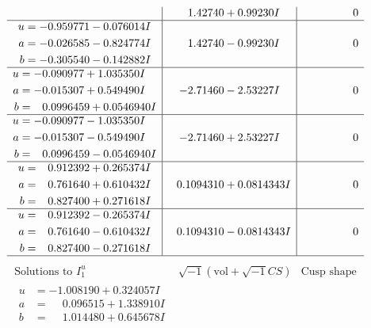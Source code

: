 \documentclass[1p]{elsarticle_modified}
\theoremstyle{definition}
\newcommand{\I}{\sqrt{-1}}
\begin{document}
$$\begin{array}{c|c|c}
 & \phantom{-}1.42740 + 0.99230 I & \phantom{-0.000000 } 0 \\ \hline\begin{aligned}
u &= -0.959771 - 0.076014 I \\
a &= -0.026585 - 0.824774 I \\
b &= -0.305540 - 0.142882 I\end{aligned}
 & \phantom{-}1.42740 - 0.99230 I & \phantom{-0.000000 } 0 \\ \hline\begin{aligned}
u &= -0.090977 + 1.035350 I \\
a &= -0.015307 + 0.549490 I \\
b &= \phantom{-}0.0996459 + 0.0546940 I\end{aligned}
 & -2.71460 - 2.53227 I & \phantom{-0.000000 } 0 \\ \hline\begin{aligned}
u &= -0.090977 - 1.035350 I \\
a &= -0.015307 - 0.549490 I \\
b &= \phantom{-}0.0996459 - 0.0546940 I\end{aligned}
 & -2.71460 + 2.53227 I & \phantom{-0.000000 } 0 \\ \hline\begin{aligned}
u &= \phantom{-}0.912392 + 0.265374 I \\
a &= \phantom{-}0.761640 + 0.610432 I \\
b &= \phantom{-}0.827400 + 0.271618 I\end{aligned}
 & \phantom{-}0.1094310 + 0.0814343 I & \phantom{-0.000000 } 0 \\ \hline\begin{aligned}
u &= \phantom{-}0.912392 - 0.265374 I \\
a &= \phantom{-}0.761640 - 0.610432 I \\
b &= \phantom{-}0.827400 - 0.271618 I\end{aligned}
 & \phantom{-}0.1094310 - 0.0814343 I & \phantom{-0.000000 } 0\\
 \hline 
 \end{array}$$\newpage$$\begin{array}{c|c|c}  
\text{Solutions to }I^u_{1}& \I (\text{vol} + \sqrt{-1}CS) & \text{Cusp shape}\\
 \hline 
\begin{aligned}
u &= -1.008190 + 0.324057 I \\
a &= \phantom{-}0.096515 + 1.338910 I \\
b &= \phantom{-}1.014480 + 0.645678 I\end{aligned}

\end{array}$$
\end{document}
